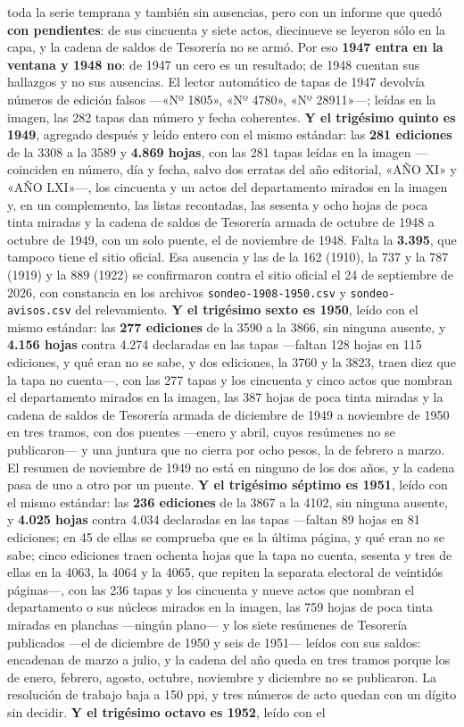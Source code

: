 toda la serie temprana y también sin ausencias, pero con un informe que quedó \textbf{con pendientes}: de sus cincuenta y siete actos, diecinueve se leyeron sólo en la capa, y la cadena de saldos de Tesorería no se armó. Por eso \textbf{1947 entra en la ventana y 1948 no}: de 1947 un cero es un resultado; de 1948 cuentan sus hallazgos y no sus ausencias. El lector automático de tapas de 1947 devolvía números de edición falsos ---«Nº 1805», «Nº 4780», «Nº 28911»---; leídas en la imagen, las 282 tapas dan número y fecha coherentes. \textbf{Y el trigésimo quinto es 1949}, agregado después y leído entero con el mismo estándar: las \textbf{281 ediciones} de la 3308 a la 3589 y \textbf{4.869 hojas}, con las 281 tapas leídas en la imagen ---coinciden en número, día y fecha, salvo dos erratas del año editorial, «AÑO XI» y «AÑO LXI»---, los cincuenta y un actos del departamento mirados en la imagen y, en un complemento, las listas recontadas, las sesenta y ocho hojas de poca tinta miradas y la cadena de saldos de Tesorería armada de octubre de 1948 a octubre de 1949, con un solo puente, el de noviembre de 1948. Falta la \textbf{3.395}, que tampoco tiene el sitio oficial. Esa ausencia y las de la 162 (1910), la 737 y la 787 (1919) y la 889 (1922) se confirmaron contra el sitio oficial el 24 de septiembre de 2026, con constancia en los archivos \texttt{sondeo-1908-1950.csv} y \texttt{sondeo-avisos.csv} del relevamiento. \textbf{Y el trigésimo sexto es 1950}, leído con el mismo estándar: las \textbf{277 ediciones} de la 3590 a la 3866, sin ninguna ausente, y \textbf{4.156 hojas} contra 4.274 declaradas en las tapas ---faltan 128 hojas en 115 ediciones, y qué eran no se sabe, y dos ediciones, la 3760 y la 3823, traen diez que la tapa no cuenta---, con las 277 tapas y los cincuenta y cinco actos que nombran el departamento mirados en la imagen, las 387 hojas de poca tinta miradas y la cadena de saldos de Tesorería armada de diciembre de 1949 a noviembre de 1950 en tres tramos, con dos puentes ---enero y abril, cuyos resúmenes no se publicaron--- y una juntura que no cierra por ocho pesos, la de febrero a marzo. El resumen de noviembre de 1949 no está en ninguno de los dos años, y la cadena pasa de uno a otro por un puente. \textbf{Y el trigésimo séptimo es 1951}, leído con el mismo estándar: las \textbf{236 ediciones} de la 3867 a la 4102, sin ninguna ausente, y \textbf{4.025 hojas} contra 4.034 declaradas en las tapas ---faltan 89 hojas en 81 ediciones; en 45 de ellas se comprueba que es la última página, y qué eran no se sabe; cinco ediciones traen ochenta hojas que la tapa no cuenta, sesenta y tres de ellas en la 4063, la 4064 y la 4065, que repiten la separata electoral de veintidós páginas---, con las 236 tapas y los cincuenta y nueve actos que nombran el departamento o sus núcleos mirados en la imagen, las 759 hojas de poca tinta miradas en planchas ---ningún plano--- y los siete resúmenes de Tesorería publicados ---el de diciembre de 1950 y seis de 1951--- leídos con sus saldos: encadenan de marzo a julio, y la cadena del año queda en tres tramos porque los de enero, febrero, agosto, octubre, noviembre y diciembre no se publicaron. La resolución de trabajo baja a 150 ppi, y tres números de acto quedan con un dígito sin decidir. \textbf{Y el trigésimo octavo es 1952}, leído con el 
